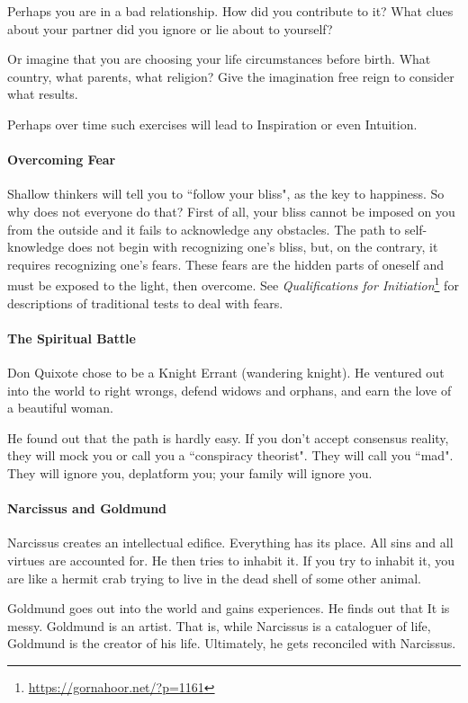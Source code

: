 Perhaps you are in a bad relationship. How did you contribute to it? What clues about your partner did you ignore or lie about to yourself?

Or imagine that you are choosing your life circumstances before birth. What country, what parents, what religion? Give the imagination free reign to consider what results.

Perhaps over time such exercises will lead to Inspiration or even Intuition.

\paragraph{Overcoming Fear}
Shallow thinkers will tell you to ``follow your bliss", as the key to happiness. So why does not everyone do that? First of all, your bliss cannot be imposed on you from the outside and it fails to acknowledge any obstacles. The path to self-knowledge does not begin with recognizing one's bliss, but, on the contrary, it requires recognizing one's fears. These fears are the hidden parts of oneself and must be exposed to the light, then overcome. See \textit{Qualifications for Initiation}\footnote{\url{https://gornahoor.net/?p=1161}} for descriptions of traditional tests to deal with fears.

\paragraph{The Spiritual Battle}
Don Quixote chose to be a Knight Errant (wandering knight). He ventured out into the world to right wrongs, defend widows and orphans, and earn the love of a beautiful woman.

He found out that the path is hardly easy. If you don't accept consensus reality, they will mock you or call you a ``conspiracy theorist". They will call you ``mad". They will ignore you, deplatform you; your family will ignore you.

\paragraph{Narcissus and Goldmund}
Narcissus creates an intellectual edifice. Everything has its place. All sins and all virtues are accounted for. He then tries to inhabit it. If you try to inhabit it, you are like a hermit crab trying to live in the dead shell of some other animal.

Goldmund goes out into the world and gains experiences. He finds out that It is messy. Goldmund is an artist. That is, while Narcissus is a cataloguer of life, Goldmund is the creator of his life. Ultimately, he gets reconciled with Narcissus.

